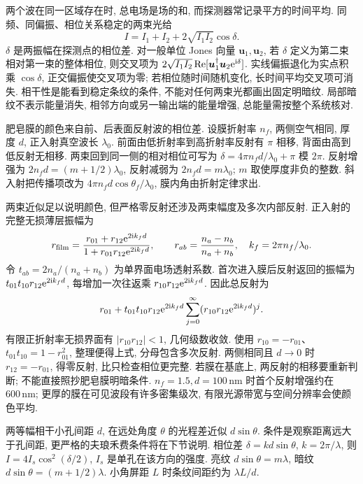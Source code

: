 \label{ch:diffraction}
两个波在同一区域存在时, 总电场是场的和, 而探测器常记录平方的时间平均. 同频、同偏振、相位关系稳定的两束光给
\[
I=I_1+I_2+2\sqrt{I_1I_2}\cos\delta.
\]
$\delta$ 是两振幅在探测点的相位差. 对一般单位 Jones 向量 $\boldsymbol u_1,\boldsymbol u_2$, 若 $\delta$ 定义为第二束相对第一束的整体相位, 则交叉项为 $2\sqrt{I_1I_2}\operatorname{Re}[\boldsymbol u_1^\dagger\boldsymbol u_2\mathrm e^{\mathrm i\delta}]$. 实线偏振退化为实点积乘 $\cos\delta$, 正交偏振使交叉项为零; 若相位随时间随机变化, 长时间平均交叉项可消失. 相干性是能看到稳定条纹的条件, 不能对任何两束光都画出固定明暗纹. 局部暗纹不表示能量消失, 相邻方向或另一输出端的能量增强, 总能量需按整个系统核对.

肥皂膜的颜色来自前、后表面反射波的相位差. 设膜折射率 $n_f$, 两侧空气相同, 厚度 $d$, 正入射真空波长 $\lambda_0$. 前面由低折射率到高折射率反射有 $\pi$ 相移, 背面由高到低反射无相移. 两束回到同一侧的相对相位可写为 $\delta=4\pi n_fd/\lambda_0+\pi$ 模 $2\pi$. 反射增强为 $2n_fd=(m+1/2)\lambda_0$, 反射减弱为 $2n_fd=m\lambda_0$; $m$ 取使厚度非负的整数. 斜入射把传播项改为 $4\pi n_fd\cos\theta_f/\lambda_0$, 膜内角由折射定律求出.

两束近似足以说明颜色, 但严格零反射还涉及两束幅度及多次内部反射. 正入射的完整无损薄层振幅为
\[
r_{\rm film}=\frac{r_{01}+r_{12}\mathrm e^{2\mathrm i k_fd}}
{1+r_{01}r_{12}\mathrm e^{2\mathrm i k_fd}},\qquad
r_{ab}=\frac{n_a-n_b}{n_a+n_b},\quad k_f=2\pi n_f/\lambda_0.
\]
令 $t_{ab}=2n_a/(n_a+n_b)$ 为单界面电场透射系数. 首次进入膜后反射返回的振幅为 $t_{01}t_{10}r_{12}\mathrm e^{2\mathrm i k_fd}$, 每增加一次往返乘 $r_{10}r_{12}\mathrm e^{2\mathrm i k_fd}$. 因此总反射为
\[r_{01}+t_{01}t_{10}r_{12}\mathrm e^{2\mathrm i k_fd}\sum_{j=0}^{\infty}(r_{10}r_{12}\mathrm e^{2\mathrm i k_fd})^j.\]
有限正折射率无损界面有 $|r_{10}r_{12}|<1$, 几何级数收敛. 使用 $r_{10}=-r_{01}$、$t_{01}t_{10}=1-r_{01}^2$, 整理便得上式, 分母包含多次反射. 两侧相同且 $d\to0$ 时 $r_{12}=-r_{01}$, 得零反射, 比只检查相位更完整. 若膜在基底上, 两反射的相移要重新判断; 不能直接照抄肥皂膜明暗条件. $n_f=1.5,d=100\,\mathrm{nm}$ 时首个反射增强约在 $600\,\mathrm{nm}$; 更厚的膜在可见波段有许多密集级次, 有限光源带宽与空间分辨率会使颜色平均.

两等幅相干小孔间距 $d$, 在远处角度 $\theta$ 的光程差近似 $d\sin\theta$. 条件是观察距离远大于孔间距, 更严格的夫琅禾费条件将在下节说明. 相位差 $\delta=kd\sin\theta$, $k=2\pi/\lambda$, 则 $I=4I_s\cos^2(\delta/2)$, $I_s$ 是单孔在该方向的强度. 亮纹 $d\sin\theta=m\lambda$, 暗纹 $d\sin\theta=(m+1/2)\lambda$. 小角屏距 $L$ 时条纹间距约为 $\lambda L/d$.


